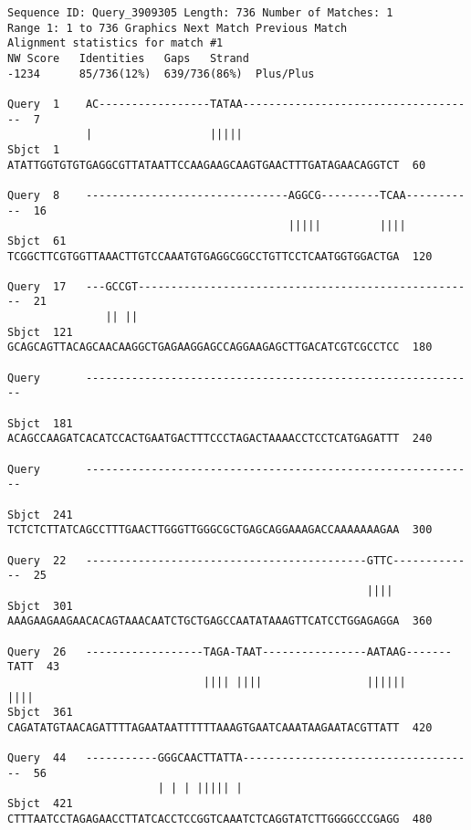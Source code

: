 \documentclass[fleqn,10pt]{article}
\begin{document}
\begin{lstlisting}[style=outputstyle,caption={Resultado detallado del alineamiento entre Secuencia 5 y Secuencia 6}]
Sequence ID: Query_3909305 Length: 736 Number of Matches: 1
Range 1: 1 to 736 Graphics Next Match Previous Match
Alignment statistics for match #1
NW Score   Identities   Gaps   Strand
-1234      85/736(12%)  639/736(86%)  Plus/Plus

Query  1    AC-----------------TATAA------------------------------------  7
            |                  |||||                                    
Sbjct  1    ATATTGGTGTGTGAGGCGTTATAATTCCAAGAAGCAAGTGAACTTTGATAGAACAGGTCT  60

Query  8    -------------------------------AGGCG---------TCAA-----------  16
                                           |||||         ||||           
Sbjct  61   TCGGCTTCGTGGTTAAACTTGTCCAAATGTGAGGCGGCCTGTTCCTCAATGGTGGACTGA  120

Query  17   ---GCCGT----------------------------------------------------  21
               || ||                                                    
Sbjct  121  GCAGCAGTTACAGCAACAAGGCTGAGAAGGAGCCAGGAAGAGCTTGACATCGTCGCCTCC  180

Query       ------------------------------------------------------------  
                                                                        
Sbjct  181  ACAGCCAAGATCACATCCACTGAATGACTTTCCCTAGACTAAAACCTCCTCATGAGATTT  240

Query       ------------------------------------------------------------  
                                                                        
Sbjct  241  TCTCTCTTATCAGCCTTTGAACTTGGGTTGGGCGCTGAGCAGGAAAGACCAAAAAAAGAA  300

Query  22   -------------------------------------------GTTC-------------  25
                                                       ||||             
Sbjct  301  AAAGAAGAAGAACACAGTAAACAATCTGCTGAGCCAATATAAAGTTCATCCTGGAGAGGA  360

Query  26   ------------------TAGA-TAAT----------------AATAAG-------TATT  43
                              |||| ||||                ||||||       ||||
Sbjct  361  CAGATATGTAACAGATTTTAGAATAATTTTTTAAAGTGAATCAAATAAGAATACGTTATT  420

Query  44   -----------GGGCAACTTATTA------------------------------------  56
                       | | | ||||| |                                    
Sbjct  421  CTTTAATCCTAGAGAACCTTATCACCTCCGGTCAAATCTCAGGTATCTTGGGGCCCGAGG  480


\end{lstlisting}
\end{document}
